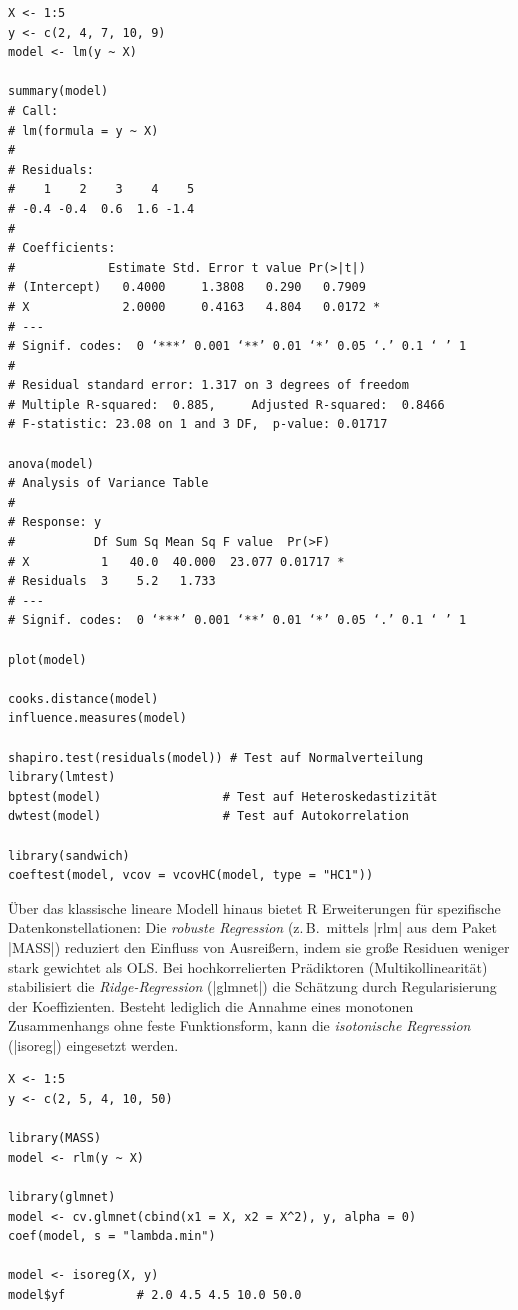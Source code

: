 \documentclass[10pt,twocolumn]{scrartcl}
\renewcommand{\lstinline}{\mycoloredinline}
\begin{document}
\begin{lstlisting}
X <- 1:5
y <- c(2, 4, 7, 10, 9)
model <- lm(y ~ X)

summary(model)
# Call:
# lm(formula = y ~ X)
#
# Residuals:
#    1    2    3    4    5 
# -0.4 -0.4  0.6  1.6 -1.4 
#
# Coefficients:
#             Estimate Std. Error t value Pr(>|t|)  
# (Intercept)   0.4000     1.3808   0.290   0.7909  
# X             2.0000     0.4163   4.804   0.0172 *
# ---
# Signif. codes:  0 ‘***’ 0.001 ‘**’ 0.01 ‘*’ 0.05 ‘.’ 0.1 ‘ ’ 1
#
# Residual standard error: 1.317 on 3 degrees of freedom
# Multiple R-squared:  0.885,     Adjusted R-squared:  0.8466 
# F-statistic: 23.08 on 1 and 3 DF,  p-value: 0.01717

anova(model)
# Analysis of Variance Table
#
# Response: y
#           Df Sum Sq Mean Sq F value  Pr(>F)  
# X          1   40.0  40.000  23.077 0.01717 *
# Residuals  3    5.2   1.733                  
# ---
# Signif. codes:  0 ‘***’ 0.001 ‘**’ 0.01 ‘*’ 0.05 ‘.’ 0.1 ‘ ’ 1

plot(model)

cooks.distance(model)
influence.measures(model)

shapiro.test(residuals(model)) # Test auf Normalverteilung
library(lmtest)
bptest(model)                 # Test auf Heteroskedastizität
dwtest(model)                 # Test auf Autokorrelation

library(sandwich)
coeftest(model, vcov = vcovHC(model, type = "HC1"))
\end{lstlisting}

Über das klassische lineare Modell hinaus bietet R Erweiterungen für spezifische Datenkonstellationen: Die \emph{robuste Regression} (z.\,B.\ mittels \lstinline|rlm| aus dem Paket \lstinline|MASS|) reduziert den Einfluss von Ausreißern, indem sie große Residuen weniger stark gewichtet als OLS. Bei hochkorrelierten Prädiktoren (Multikollinearität) stabilisiert die \emph{Ridge-Regression} (\lstinline|glmnet|) die Schätzung durch Regularisierung der Koeffizienten. Besteht lediglich die Annahme eines monotonen Zusammenhangs ohne feste Funktionsform, kann die \emph{isotonische Regression} (\lstinline|isoreg|) eingesetzt werden.

\begin{lstlisting}
X <- 1:5
y <- c(2, 5, 4, 10, 50)

library(MASS)
model <- rlm(y ~ X)

library(glmnet)
model <- cv.glmnet(cbind(x1 = X, x2 = X^2), y, alpha = 0) 
coef(model, s = "lambda.min")

model <- isoreg(X, y)
model$yf          # 2.0 4.5 4.5 10.0 50.0
\end{lstlisting}
\end{document}
